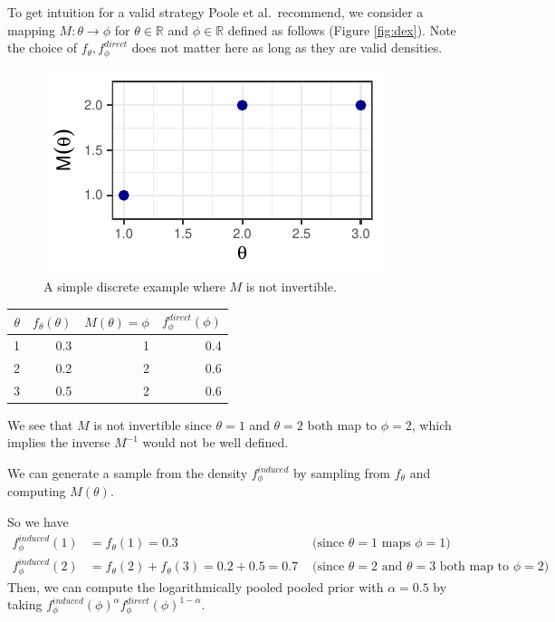 \documentclass[12pt,twoside]{smiththesis}
\begin{document}
To get intuition for a valid strategy Poole et al.~recommend, we consider a mapping \(M: \theta \to \phi\) for \(\theta \in \mathbb{R}\) and \(\phi \in \mathbb{R}\)
defined as follows (Figure \ref{fig:dex}). Note the choice of \(f_\theta,f_\phi^{direct}\) does not matter here as long as they are valid densities.
\begin{multicols}{2}
\begin{figure}

{\centering \includegraphics[width=1\linewidth]{thesis_files/figure-latex/unnamed-chunk-4-1} 

}

\caption{\label{fig:dex}A simple discrete example where $M$ is not invertible.}\label{fig:unnamed-chunk-4}
\end{figure}
\columnbreak
\begin{table}[H]
\centering
\begin{tabular}[t]{r|r|r|r}
\hline
$\theta$ & $f_\theta(\theta)$ & $M(\theta)=\phi$ & $f_\phi^{direct}(\phi)$\\
\hline
1 & 0.3 & 1 & 0.4\\
\hline
2 & 0.2 & 2 & 0.6\\
\hline
3 & 0.5 & 2 & 0.6\\
\hline
\end{tabular}
\end{table}
\end{multicols}
We see that \(M\) is not invertible since \(\theta=1\) and \(\theta = 2\) both map to \(\phi=2\), which implies the inverse \(M^{-1}\) would not be well defined.

We can generate a sample from the density \(f_\phi^{induced}\) by sampling from \(f_\theta\) and computing \(M(\theta)\).

So we have
\begin{align*}
f_\phi^{induced}(1) &= f_{\theta}(1) = 0.3 & \text{ (since $\theta = 1$ maps $\phi = 1$) } \\
f_\phi^{induced}(2) &= f_{\theta}(2) +  f_{\theta}(3) = 0.2 + 0.5=  0.7 & \text{ (since $\theta = 2$ and $\theta=3$ both map to $\phi = 2$) }
\end{align*}
Then, we can compute the logarithmically pooled pooled prior with \(\alpha=0.5\) by taking \(f_\phi^{induced}(\phi)^{\alpha} f_\phi^{direct}(\phi)^{1-\alpha}\).
\end{document}
